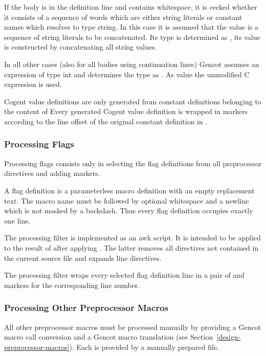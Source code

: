 If the body is in the definition line and contains whitespace, it is cecked whether it consists of a sequence
of words which are either string literals or constant names which resolves to type string. In this case it 
is assumed that the value is a sequence of string literals to be concatenated. Its type is determined as 
, its value is constructed by concatenating all string values.

In all other cases (also for all bodies using continuation lines) Gencot assumes an expression of type int
and determines the type as . As value the unmodified C expression is used.

Cogent value definitions are only generated from constant definitions belonging to the content of 
Every generated Cogent value definition is wrapped in  markers according to the line offset
of the original constant definition in .

\subsubsection{Processing Flags}

Processing flags consists only in selecting the flag definitions from all preprocessor directives and adding
 markers.

A flag definition is a parameterless macro definition with an empty replacement text. The macro name must 
be followed by optional whitespace and a newline which is not masked by a backslash. Thus every flag definition
occupies exactly one line.

The processing filter  is implemented as an awk script. It is intended to be applied 
to the result
of  after applying . The latter removes all directives not contained
in the current source file and expands line directives. 

The processing filter wraps every selected flag definition line in a pair of  and  
markers for the corresponding line number.

\subsubsection{Processing Other Preprocessor Macros}

All other preprocessor macros must be processed manually by providing a Gencot macro call conversion and a
Gencot macro translation (see Section~\ref{design-preprocessor-macros}). Each is provided by a manually
prepared file.


